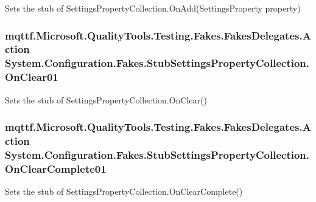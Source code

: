 Sets the stub of Settings\-Property\-Collection.\-On\-Add(\-Settings\-Property property)

\hypertarget{class_system_1_1_configuration_1_1_fakes_1_1_stub_settings_property_collection_a6a81c70382ddad18c138856b6b02b166}{
\subsubsection[{On\-Clear01}]{\setlength{\rightskip}{0pt plus 5cm}mqttf.\-Microsoft.\-Quality\-Tools.\-Testing.\-Fakes.\-Fakes\-Delegates.\-Action System.\-Configuration.\-Fakes.\-Stub\-Settings\-Property\-Collection.\-On\-Clear01}}\label{class_system_1_1_configuration_1_1_fakes_1_1_stub_settings_property_collection_a6a81c70382ddad18c138856b6b02b166}


Sets the stub of Settings\-Property\-Collection.\-On\-Clear()

\hypertarget{class_system_1_1_configuration_1_1_fakes_1_1_stub_settings_property_collection_ad59ba24a401c9a84b9b0183f347738bf}{
\subsubsection[{On\-Clear\-Complete01}]{\setlength{\rightskip}{0pt plus 5cm}mqttf.\-Microsoft.\-Quality\-Tools.\-Testing.\-Fakes.\-Fakes\-Delegates.\-Action System.\-Configuration.\-Fakes.\-Stub\-Settings\-Property\-Collection.\-On\-Clear\-Complete01}}\label{class_system_1_1_configuration_1_1_fakes_1_1_stub_settings_property_collection_ad59ba24a401c9a84b9b0183f347738bf}


Sets the stub of Settings\-Property\-Collection.\-On\-Clear\-Complete()

